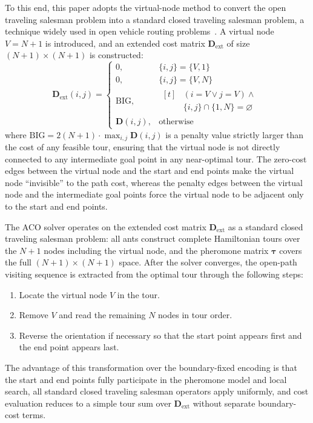 To this end, this paper adopts the virtual-node method to convert the open traveling salesman problem into a standard closed traveling salesman problem, a technique widely used in open vehicle routing problems~\textcolor{blue}{\cite{ref32}}. A virtual node $V = N + 1$ is introduced, and an extended cost matrix $\mathbf{D}_{\mathrm{ext}}$ of size $(N+1) \times (N+1)$ is constructed:
\begin{equation}
\mathbf{D}_{\mathrm{ext}}(i, j) =
\begin{cases}
0, & \{i, j\} = \{V, 1\} \\
0, & \{i, j\} = \{V, N\} \\
\mathrm{BIG}, & \begin{aligned}[t]
& (i = V \lor j = V) \land \\
& \{i, j\} \cap \{1, N\} = \varnothing
\end{aligned} \\
\mathbf{D}(i, j), & \text{otherwise}
\end{cases}
\label{eq:dext}
\end{equation}
where $\mathrm{BIG} = 2(N+1) \cdot \max_{i,j} \mathbf{D}(i,j)$ is a penalty value strictly larger than the cost of any feasible tour, ensuring that the virtual node is not directly connected to any intermediate goal point in any near-optimal tour. The zero-cost edges between the virtual node and the start and end points make the virtual node ``invisible'' to the path cost, whereas the penalty edges between the virtual node and the intermediate goal points force the virtual node to be adjacent only to the start and end points.

The ACO solver operates on the extended cost matrix $\mathbf{D}_{\mathrm{ext}}$ as a standard closed traveling salesman problem: all ants construct complete Hamiltonian tours over the $N+1$ nodes including the virtual node, and the pheromone matrix $\bm{\tau}$ covers the full $(N+1) \times (N+1)$ space. After the solver converges, the open-path visiting sequence is extracted from the optimal tour through the following steps:
\begin{enumerate}
\item Locate the virtual node $V$ in the tour.
\item Remove $V$ and read the remaining $N$ nodes in tour order.
\item Reverse the orientation if necessary so that the start point appears first and the end point appears last.
\end{enumerate}
The advantage of this transformation over the boundary-fixed encoding is that the start and end points fully participate in the pheromone model and local search, all standard closed traveling salesman operators apply uniformly, and cost evaluation reduces to a simple tour sum over $\mathbf{D}_{\mathrm{ext}}$ without separate boundary-cost terms.


